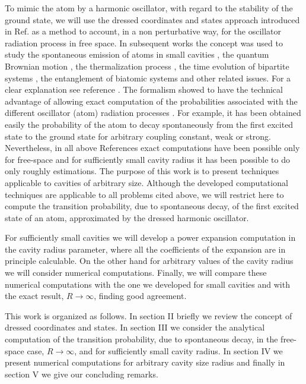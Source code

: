 \documentclass[10pt,english,twocolumn]{revtex4}
\begin{document}
To mimic the atom by a harmonic oscillator, with regard to the stability of the ground state, we will use the dressed coordinates and states
approach introduced in Ref. \cite{adolfo1} as a method to account, in a non perturbative way, for
the oscillator radiation process in free space. In subsequent works the concept was used to study the spontaneous emission
of atoms in small cavities \cite{adolfo2}, the quantum Brownian motion \cite{gabriel,adolfoan}, the thermalization process
\cite{gabrielsolo,gabrielyony,thermalst}, the time evolution of bipartite systems \cite{bipartite0,bipartite1,bipartite2}, the entanglement
of biatomic systems \cite{entangled1,entangled2,onofre} and other related issues\cite{nonlinear,yony,eletromag,casana2,casana}.
For a clear explanation see reference \cite{yony}. The formalism
showed to have the technical advantage of allowing exact computation
of the probabilities associated with the different oscillator (atom)
radiation processes \cite{casana}. For example, it has been obtained
easily the probability of the atom to decay spontaneously from the
first excited state to the ground state for arbitrary coupling constant,
weak or strong.
Nevertheless, in all above References exact computations have been possible only for free-space and
for sufficiently small cavity radius it has been possible to do only roughly estimations. The purpose of this work is to present 
techniques applicable to cavities of arbitrary size.
Although the developed computational techniques are applicable to all problems cited above, we will restrict here to compute
the transition probability, due to spontaneous decay,  of the first excited state of an atom, approximated by the dressed harmonic oscillator.

For sufficiently small cavities we will develop a power  expansion computation in the  cavity radius parameter, where
all the coefficients of the expansion are in principle calculable. On the other hand for arbitrary values of the cavity radius we will
consider numerical computations. Finally, we will compare these numerical computations with the one
we developed for small cavities and with the exact result, $R\to\infty$, finding good agreement.

This work is organized as follows. In section II briefly we review the concept of dressed coordinates
and states. In section III we consider the analytical  computation of the transition probability, due to spontaneous decay,  
in the free-space case, $R\to\infty$, and for sufficiently small cavity radius. In section IV we present numerical computations 
for arbitrary cavity size radius and finally in section V we give our concluding remarks. 
\end{document}
